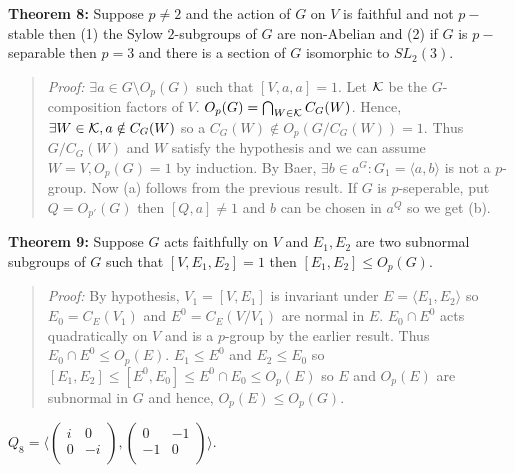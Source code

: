 {\bf Theorem 8:}
Suppose $p \ne 2$ and the action of
$G$ on $V$ is faithful and not $p-$stable then (1) the Sylow $2$-subgroups of
$G$ are non-Abelian and (2) if $G$ is $p-$separable 
then $p=3$ and there is a section of
$G$ isomorphic to $SL_2(3)$.
\begin{quote}
\emph{Proof:}  
$\exists a \in G \setminus O_p(G)$ such that $[V,a,a] = 1$.  Let ${\cal K}$ be the
$G$-composition factors of $V$.  $O_p(G)= \bigcap_{W \in {\cal K}} C_G(W)$.  Hence,
$\exists W \in {\cal K}, a \notin C_G(W)$ so a $C_G(W) \notin O_p(G/C_G(W)) = 1$.
Thus $G/C_G(W)$ and $W$ satisfy the hypothesis and we can assume $W=V, O_p(G)=1$ by
induction.  By Baer, $\exists b \in a^G: G_1 = \langle a,b \rangle $ is not a $p$-group.  Now
(a) follows from the previous result.  If $G$ is $p$-seperable, put $Q= O_{p'}(G)$ then
$[Q, a] \ne 1$ and $b$ can be chosen in $a^Q$ so we get (b).
\end{quote}
{\bf Theorem 9:} Suppose $G$ acts faithfully on $V$ and $E_1 , E_2$ are
two subnormal subgroups of $G$ 
such that $[V,E_1 , E_2 ]=1$ then $[E_1 , E_2 ] \le O_p (G)$.
\begin{quote}
\emph{Proof:}  
By hypothesis, $V_1= [V, E_1]$ is invariant under $E= \langle E_1 , E_2 \rangle $ so
$E_0 = C_E(V_1)$ and $E^0= C_E(V/V_1)$ are normal in $E$.
$E_0 \cap E^0$ acts quadratically on $V$ and is a $p$-group by the earlier result.
Thus $E_0 \cap E^0 \le O_p(E)$.
$E_1 \le E^0$ and
$E_2 \le E_0$ so $[E_1 , E_2 ] \le [E^0 , E_0] \le E^0 \cap E_0 \le O_p(E)$ so
$E$ and $O_p(E)$ are subnormal in $G$ and hence, $O_p(E) \le O_p(G)$.
\end{quote}
$Q_8= \langle
\left(
\begin{array}{cc}
i & 0 \\
0 & -i \\
\end{array}
\right),
\left( 
\begin{array}{cc}
0 & -1 \\
-1 & 0 \\
\end{array}
\right) \rangle $.

